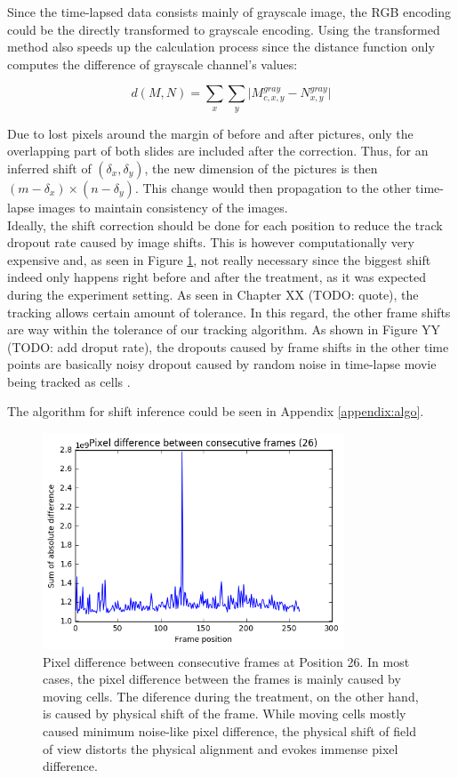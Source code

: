 \documentclass[pdftex,12pt,a4paper]{report}
\begin{document}

Since the time-lapsed data consists mainly of grayscale image, the RGB encoding could be the directly transformed to grayscale encoding. Using the transformed method also speeds up the calculation process since the distance function only computes the difference of grayscale channel's values:

$$
d(M, N) =  \sum_{x} \sum_{y} \vert M_{c, x, y}^{gray} - N_{x, y}^{gray}\vert
$$

Due to lost pixels around the margin of before and after pictures, only the overlapping part of both slides are included after the correction. Thus, for an inferred shift of $(\delta_x, \delta_y)$, the new dimension of the pictures is then $(m - \delta_x) \times (n - \delta_y)$. This change would then propagation to the other time-lapse images to maintain consistency of the images.\\

Ideally, the shift correction should be done for each position to reduce the track dropout rate caused by image shifts. This is however computationally very expensive and, as seen in Figure \ref{fig:pixdiff}, not really necessary since the biggest shift indeed only happens right before and after the treatment, as it was expected during the experiment setting. As seen in Chapter XX (TODO: quote), the tracking allows certain amount of tolerance. In this regard, the other frame shifts are way within the tolerance of our tracking algorithm. As shown in Figure YY (TODO: add droput rate), the dropouts caused by frame shifts in the other time points are basically noisy dropout caused by random noise in time-lapse movie being tracked as cells \cite{jaqaman2008robust}.

The algorithm for shift inference could be seen in Appendix \ref{appendix:algo}.

\begin{figure}[h]
\centering
\includegraphics[width=0.8\textwidth]{images/pixdiff}
\caption{Pixel difference between consecutive frames at Position 26. In most cases, the pixel difference between the frames is mainly caused by moving cells. The diference during the treatment, on the other hand, is caused by physical shift of the frame. While moving cells mostly caused minimum noise-like pixel difference, the physical shift of field of view distorts the physical alignment and evokes immense pixel difference.}
\label{fig:pixdiff}
\end{figure}
\end{document}
